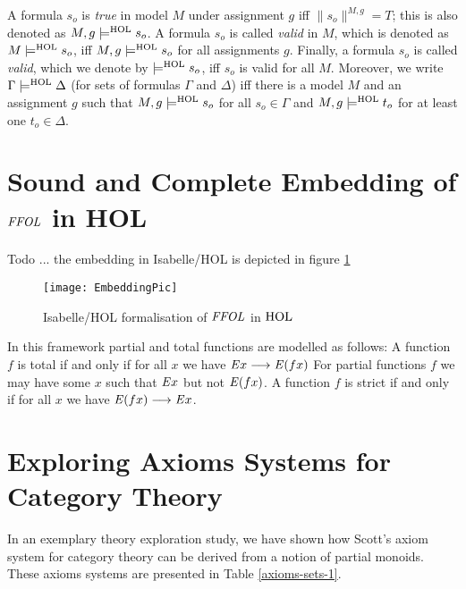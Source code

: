 \begin{definition}\label{homlvalid}
A formula $s_o$ is \emph{true} in model $M$ 
under assignment $g$ iff $\|s_o\|^{M,g} = T$; this is also denoted
as $M,g \models^{\text{\textrm{HOL}}} s_o$.  A formula $s_o$ is called \emph{valid} in
$M$, which is denoted as $M \models^{\text{\textrm{HOL}}} s_o$, iff $M,g \models^{\text{\textrm{HOL}}} s_o$ for all
assignments $g$. Finally, a formula $s_o$ is called
\emph{valid}, which we denote by $\models^{\text{\textrm{HOL}}} s_o$, iff $s_o$ is valid for
all $M$. Moreover, we write $\Gamma\models^{\text{\textrm{HOL}}} \Delta$ (for sets of
 formulas $\Gamma$ and $\Delta$) iff there is a model $M$ and an assignment $g$ such that  
 $M,g \models^{\text{\textrm{HOL}}} s_o$ for all $s_o\in \Gamma$ and $M,g \models^{\text{\textrm{HOL}}} t_o$ for at least one $t_o\in \Delta$.
\end{definition}







\section{Sound and Complete Embedding of $\mathit{FFOL}$ in HOL}
Todo ... the embedding in Isabelle/HOL is depicted in 
figure \ref{pic1}

\begin{figure}[t]
 \texttt{[image: EmbeddingPic]}
 \caption{Isabelle/HOL formalisation of $\mathit{FFOL}$ in $\text{\textrm{HOL}}$ \label{pic1}}
\end{figure}


In this framework partial and total functions are modelled as follows: 
A function $f$ is total if and only if for all $x$ we have $\mathit{E} x \longrightarrow \mathit{E}(f x)$ 
For partial functions $f$ we may have some $x$ such that $\mathit{E} x$ but not
 $\mathit{E}(f x)$. A function $f$ is strict  if  and only if for all $x$
we have $\mathit{E}(f x) \longrightarrow \mathit{E} x$.


\section{Exploring Axioms Systems for Category Theory}
In an exemplary theory exploration study, we have shown how Scott's
\cite{Scott79} axiom system for category theory can be derived from a
notion of partial monoids. These axioms systems are presented in Table \ref{axioms-sets-1}.

